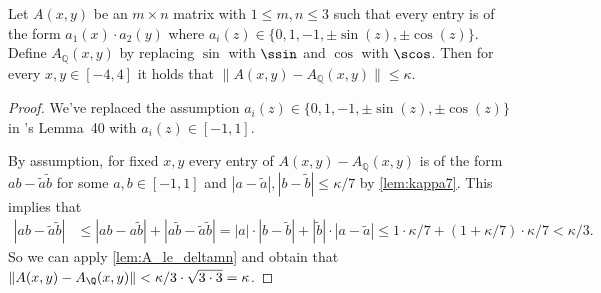 \begin{lemma}\label{lem:dist_le_kappa}
\leanok
{}
    Let $A(x,y)$ be an $m\times n$ matrix with $1 \leq m,n\leq 3$ such that every entry is of the form $a_1(x)\cdot a_2(y)$ where
    $a_i(z)\in \{0,1,-1,\pm\sin(z),\pm\cos(z)\}.$
    Define $A_{\mathbb{Q}}(x,y)$ by replacing $\sin$ with $\ssin$ and $\cos$ with $\scos$. Then for every $x,y\in[-4,4]$ it holds that
    $\|A(x,y)-A_{\mathbb{Q}}(x,y)\|\leq\kappa$.
\end{lemma}

\begin{proof}
\leanok
{}
    We've replaced the assumption $a_i(z)\in \{0,1,-1,\pm\sin(z),\pm\cos(z)\}$ in \cite{polyhedron.without.rupert}'s
    Lemma~40 with $a_i(z)\in [-1,1]$.

    By assumption, for fixed $x,y$ every entry of $A(x,y)-A_{\mathbb{Q}}(x,y)$ is of the form
    $a b - \widetilde{a}\widetilde{b}$ for some $a,b\in[-1,1]$ and $|a-\widetilde{a}|,|b-\widetilde{b}|\leq \kappa/7$ by \cref{lem:kappa7}. This implies that
    \begin{align*}
      |ab-\widetilde{a}\widetilde{b}|&\leq |a b-a\widetilde{b}|+|a \widetilde{b}-\widetilde{a}\widetilde{b}|
      =|a|\cdot |b-\widetilde{b}|+|\widetilde{b}|\cdot |a-\widetilde{a}| \leq 1\cdot \kappa/7+(1+\kappa/7) \cdot \kappa/7 <\kappa/3.
    \end{align*}
    So we can apply \cref{lem:A_le_deltamn} and obtain that $\|A(x,y)-A_{\Q}(x,y)\|<\kappa/3\cdot \sqrt{3\cdot 3}=\kappa$.
\end{proof}


